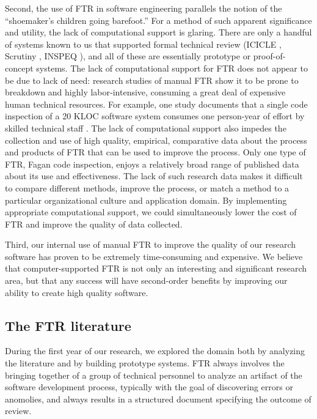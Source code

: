 Second, the use of FTR in software engineering parallels the notion of the
``shoemaker's children going barefoot.''  For a method of such apparent
significance and utility, the lack of computational support is glaring.
There are only a handful of systems known to us that supported formal
technical review (ICICLE \cite{Brothers90}, Scrutiny \cite{Gintell93},
INSPEQ \cite{Knight91}), and all of these are essentially prototype or
proof-of-concept systems.  The lack of computational support for FTR does
not appear to be due to lack of need: research studies of manual FTR show
it to be prone to breakdown and highly labor-intensive, consuming a great
deal of expensive human technical resources. For example, one study
documents that a single code inspection of a 20 KLOC software system
consumes one person-year of effort by skilled technical staff
\cite{Russell91}.  The lack of computational support also impedes the
collection and use of high quality, empirical, comparative data about the
process and products of FTR that can be used to improve the process. Only
one type of FTR, Fagan code inspection, enjoys a relatively broad range of
published data about its use and effectiveness.  The lack of such research
data makes it difficult to compare different methods, improve the process,
or match a method to a particular organizational culture and application
domain.  By implementing appropriate computational support, we could
simultaneously lower the cost of FTR and improve the quality of data
collected.

Third, our internal use of manual FTR to improve the quality of our
research software has proven to be extremely time-consuming and expensive.
We believe that computer-supported FTR is not only an interesting and
significant research area, but that any success will have second-order
benefits by improving our ability to create high quality software.


\subsection{The FTR literature}

During the first year of our research, we explored the domain both
by analyzing the literature and by building prototype systems.  
FTR always involves the bringing together of a group of technical
personnel to analyze an artifact of the software development process,
typically with the goal of discovering errors or anomolies, and always
results in a structured document specifying the outcome of review. 

